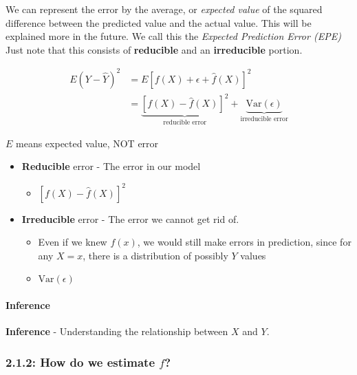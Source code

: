 We can represent the error by the average, or \emph{expected value} of the squared difference between the predicted value and the actual value.
This will be explained more in the future. We call this the \emph{Expected Prediction Error (EPE)} Just note that this consists of \textbf{reducible} and an \textbf{irreducible} portion.

\begin{align*}
E(Y-\hat Y)^2 &= E[f(X) + \epsilon + \hat f(X)]^2 \\
&= \underbrace{[f(X)-\hat f(X)]^2}_{\text{reducible error} } + \underbrace{\text{Var}(\epsilon)}_{\text{irreducible error}}  \tag{2.3}
\end{align*}

\begin{note}
    \(E\) means expected value, NOT error
\end{note}

\begin{itemize}
\tightlist
\item
  \textbf{Reducible} error - The error in our model

  \begin{itemize}
  \tightlist
  \item  \([f(X)-\hat f(X)]^2\)
  \end{itemize}
\item  \textbf{Irreducible} error - The error we cannot get rid of.

  \begin{itemize}
  \tightlist
  \item  Even if we knew \(f(x)\), we would still make errors in prediction, since for any \(X=x\), there is a distribution of possibly \(Y\) values
  \item  \(\text{Var}(\epsilon)\)
  \end{itemize}
\end{itemize}
\paragraph{Inference\\}
\textbf{Inference} - Understanding the relationship between \(X\) and
\(Y\).

\subsubsection*{\texorpdfstring{2.1.2: How do we estimate \(f\)?}{2.1.2: How do we estimate f?}}\label{how-do-we-estimate-f}

